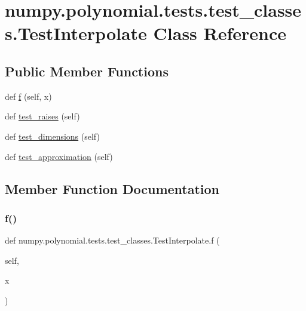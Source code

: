 \hypertarget{classnumpy_1_1polynomial_1_1tests_1_1test__classes_1_1TestInterpolate}{}\section{numpy.\+polynomial.\+tests.\+test\+\_\+classes.\+Test\+Interpolate Class Reference}
\label{classnumpy_1_1polynomial_1_1tests_1_1test__classes_1_1TestInterpolate}
\subsection*{Public Member Functions}
\begin{DoxyCompactItemize}
\item 
def \hyperlink{classnumpy_1_1polynomial_1_1tests_1_1test__classes_1_1TestInterpolate_a3e84c4e423ed40b151b7ca27038a29cf}{f} (self, x)
\item 
def \hyperlink{classnumpy_1_1polynomial_1_1tests_1_1test__classes_1_1TestInterpolate_a687632b86bdfdb4a871df15ab9b22cbc}{test\+\_\+raises} (self)
\item 
def \hyperlink{classnumpy_1_1polynomial_1_1tests_1_1test__classes_1_1TestInterpolate_abe4d95f596eafe4325123cb4e21704fc}{test\+\_\+dimensions} (self)
\item 
def \hyperlink{classnumpy_1_1polynomial_1_1tests_1_1test__classes_1_1TestInterpolate_ab7f19cb9af871223181d28724537e8e5}{test\+\_\+approximation} (self)
\end{DoxyCompactItemize}


\subsection{Member Function Documentation}
\mbox{\label{classnumpy_1_1polynomial_1_1tests_1_1test__classes_1_1TestInterpolate_a3e84c4e423ed40b151b7ca27038a29cf}} 
\subsubsection{\texorpdfstring{f()}{f()}}
{\footnotesize\ttfamily def numpy.\+polynomial.\+tests.\+test\+\_\+classes.\+Test\+Interpolate.\+f (\begin{DoxyParamCaption}\item[{}]{self,  }\item[{}]{x }\end{DoxyParamCaption})}

